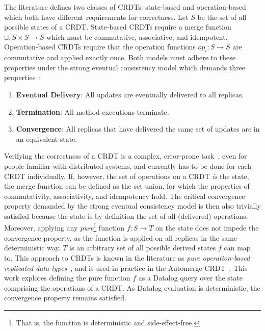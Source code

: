 The literature defines two classes of \acp{CRDT}: state-based and operation-based
which both have different requirements for correctness.
Let \( S \) be the set of all possible states of a \ac{CRDT}.
State-based \acp{CRDT} require a merge function \( \sqcup: S \times S \to S \)
which must be commutative, associative, and idempotent.
Operation-based \acp{CRDT} require that the operation functions \( op_i: S \to S \)
are commutative and applied exactly once.
Both models must adhere to these properties under the strong eventual consistency
model which demands three properties~\cite{shapiro2011comprehensive}:

\begin{enumerate}
	\item \textbf{Eventual Delivery}: All updates are eventually delivered to
	      all replicas.
	\item \textbf{Termination}: All method executions terminate.
	\item \textbf{Convergence}: All replicas that have delivered the same set of
	      updates are in an equivalent state.
\end{enumerate}

Verifying the correctness of a \ac{CRDT} is a complex,
error-prone task~\cite{gomes2017verifying, kleppmann2022assessing},
even for people familiar with distributed systems,
and currently has to be done for each \ac{CRDT} individually.
If, however, the set of operations on a \ac{CRDT} \emph{is} the state,
the merge function can be defined as the set union,
for which the properties of commutativity, associativity, and idempotency hold.
The critical convergence property demanded by the strong eventual consistency
model is then also trivially satisfied because the state is by definition
the set of all (delivered) operations.
Moreover, applying any \emph{pure}\footnote{
	That is, the function is deterministic and side-effect-free.
}
function \( f: S \to T \) on the state does not impede the convergence property,
as the function is applied on all replicas in the same deterministic way.
\( T \) is an arbitrary set of all possible derived states \( f \) can map to.
This approach to \acp{CRDT} is known in the literature as
\emph{pure operation-based replicated data types}~\cite{baquero2017pure, stewen2024undo},
and is used in practice in the Automerge \ac{CRDT}~\cite{automerge}.
This work explores defining the pure function \( f \) as a Datalog query
over the state comprising the operations of a \ac{CRDT}.
As Datalog evaluation is deterministic, the convergence property remains satisfied.

